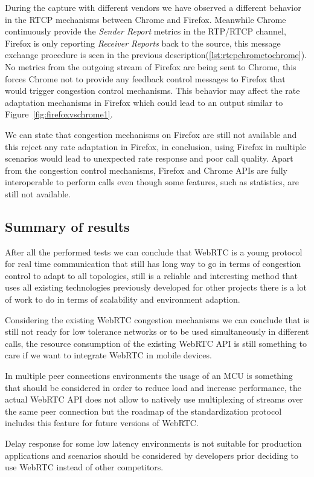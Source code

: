 During the capture with different vendors we have observed a different behavior in the RTCP mechanisms between Chrome and Firefox. Meanwhile Chrome continuously provide the {\it Sender Report} metrics in the RTP/RTCP channel, Firefox is only reporting {\it Receiver Reports} back to the source, this message exchange procedure is seen in the previous description(\ref{lst:rtcpchrometochrome}). No metrics from the outgoing stream of Firefox are being sent to Chrome, this forces Chrome not to provide any feedback control messages to Firefox that would trigger congestion control mechanisms. This behavior may affect the rate adaptation mechanisms in Firefox which could lead to an output similar to Figure~\ref{fig:firefoxvschrome1}.

We can state that congestion mechanisms on Firefox are still not available and this reject any rate adaptation in Firefox, in conclusion, using Firefox in multiple scenarios would lead to unexpected rate response and poor call quality. Apart from the congestion control mechanisms, Firefox and Chrome APIs are fully interoperable to perform calls even though some features, such as statistics, are still not available. 


\subsection{Summary of results}

After all the performed tests we can conclude that WebRTC is a young protocol for real time communication that still has long way to go in terms of congestion control to adapt to all topologies, still is a reliable and interesting method that uses all existing technologies previously developed for other projects there is a lot of work to do in terms of scalability and environment adaption. 

Considering the existing WebRTC congestion mechanisms we can conclude that is still not ready for low tolerance networks or to be used simultaneously in different calls, the resource consumption of the existing WebRTC API is still something to care if we want to integrate WebRTC in mobile devices.

In multiple peer connections environments the usage of an MCU is something that should be considered in order to reduce load and increase performance, the actual WebRTC API does not allow to natively use multiplexing of streams over the same peer connection but the roadmap of the standardization protocol includes this feature for future versions of WebRTC.

Delay response for some low latency environments is not suitable for production applications and scenarios should be considered  by developers prior deciding to use WebRTC instead of other competitors.